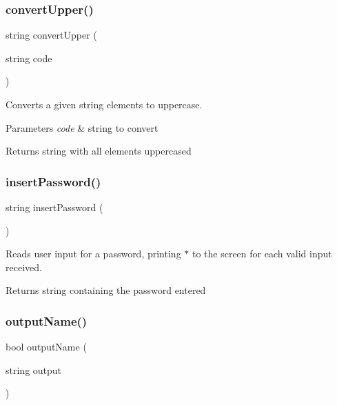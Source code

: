 \subsubsection{\texorpdfstring{convert\+Upper()}{convertUpper()}}
{\footnotesize\ttfamily string convert\+Upper (\begin{DoxyParamCaption}\item[{string}]{code }\end{DoxyParamCaption})}



Converts a given string elements to uppercase. 


\begin{DoxyParams}{Parameters}
{\em code} & string to convert\\
\hline
\end{DoxyParams}
\begin{DoxyReturn}{Returns}
string with all elements uppercased 
\end{DoxyReturn}
\mbox{\label{group___tools_gab80b2540006f8f151c4a48d31dfa7820}} 
\subsubsection{\texorpdfstring{insert\+Password()}{insertPassword()}}
{\footnotesize\ttfamily string insert\+Password (\begin{DoxyParamCaption}{ }\end{DoxyParamCaption})}



Reads user input for a password, printing \textquotesingle{}$\ast$\textquotesingle{} to the screen for each valid input received. 

\begin{DoxyReturn}{Returns}
string containing the password entered 
\end{DoxyReturn}
\mbox{\label{group___tools_gaad651b6c4e56b86cbd2ffb7821be0a54}} 
\subsubsection{\texorpdfstring{output\+Name()}{outputName()}}
{\footnotesize\ttfamily bool output\+Name (\begin{DoxyParamCaption}\item[{string}]{output }\end{DoxyParamCaption})}



